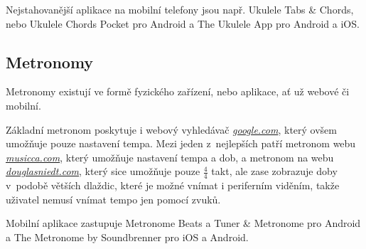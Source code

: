 Nejstahovanější aplikace na mobilní telefony jsou např. Ukulele Tabs \& Chords, nebo Ukulele Chords Pocket pro Android a The Ukulele App pro Android a iOS.

\subsection{Metronomy}
\label{ss:metronomes}
Metronomy existují ve formě fyzického zařízení, nebo aplikace, ať už webové či mobilní.

Základní metronom poskytuje i webový vyhledávač \href{www.google.com}{\emph{google.com}}, který ovšem umožňuje pouze nastavení tempa. Mezi jeden z~nejlepších patří metronom webu \href{www.musicca.com}{\emph{musicca.com}}, který umožňuje nastavení tempa a dob, a metronom na webu \href{www.douglasniedt.com}{\emph{douglasniedt.com}}, který sice umožňuje pouze $ \frac{4}{4} $ takt, ale zase zobrazuje doby v~podobě větších dlaždic, které je možné vnímat i periferním viděním, takže uživatel nemusí vnímat tempo jen pomocí zvuků.

Mobilní aplikace zastupuje Metronome Beats a Tuner \& Metronome pro Android a The Metronome by Soundbrenner pro iOS a Android.
